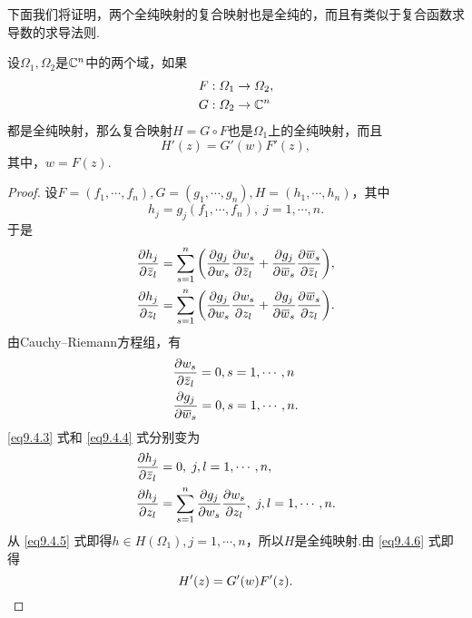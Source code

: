 下面我们将证明，两个全纯映射的复合映射也是全纯的，而且有类似于复合函数求导数的求导法则.
\begin{prop}\label{prop9.4.4}
  设$\Omega_1,\Omega_2$是$\mathbb C^n$中的两个域，如果
  \begin{align*}
    & F:\varOmega_1 \to \varOmega_2,\\
    & G:\varOmega_2 \to \mathbb C^n
  \end{align*}
  都是全纯映射，那么复合映射$H=G\circ F$也是$\Omega_1$上的全纯映射，而且
  \[
    H'(z) = G'(w)F'(z),
  \]
  其中，$w=F(z)$.
\end{prop}
\begin{proof}
  设$F=(f_1,\cdots,f_n),G=(g_1,\cdots,g_n),H=(h_1,\cdots,h_n)$，其中
  \[
    h_j = g_j(f_1,\cdots,f_n),\;j=1,\cdots,n.
  \]
  于是
  \begin{align}
    & \frac{\partial h_j}{\partial {}\mkern2mu\overline{\mkern-2muz}_l} = \sum_{s=1}^n\bigg(\frac{\partial g_j}{\partial w_s}\frac{\partial w_s}{\partial {}\mkern2mu\overline{\mkern-2muz}_l}
    + \frac{\partial g_j}{\partial {}\mkern2mu\overline{\mkern-2muw}_s}\frac{\partial {}\mkern2mu\overline{\mkern-2muw}_s}{\partial {}\mkern2mu\overline{\mkern-2muz}_l}\bigg),\label{eq9.4.3}\\
    & \frac{\partial h_j}{\partial z_l}=\sum_{s=1}^n\bigg(\frac{\partial g_j}{\partial w_s}\frac{\partial w_s}{\partial z_l}
    + \frac{\partial g_j}{\partial {}\mkern2mu\overline{\mkern-2muw}_s}\frac{\partial {}\mkern2mu\overline{\mkern-2muw}_s}{\partial z_l}\bigg).\label{eq9.4.4}
  \end{align}
  由Cauchy--Riemann方程组，有
  \begin{align*}
    & \frac{\partial w_s}{\partial {}\mkern2mu\overline{\mkern-2muz}_l} = 0, s = 1,\cdots ,n\\
    & \frac{\partial g_j}{\partial {}\mkern2mu\overline{\mkern-2muw}_s} = 0,s = 1,\cdots,n.
  \end{align*}
  \eqref{eq9.4.3} 式和 \eqref{eq9.4.4} 式分别变为
  \begin{align}
    & \frac{\partial h_j}{\partial {}\mkern2mu\overline{\mkern-2muz}_l} =  0 ,\;j,l=1,\cdots,n,\label{eq9.4.5}\\
    & \frac{\partial h_j}{\partial z_l}=\sum_{s=1}^n\frac{\partial g_j}{\partial w_s}\frac{\partial w_s}{\partial z_l},\;j,l=1,\cdots,n.\label{eq9.4.6}
  \end{align}
  从 \eqref{eq9.4.5} 式即得$h\in H(\Omega_1),j=1,\cdots,n$，所以$H$是全纯映射.由 \eqref{eq9.4.6} 式即得
  \begin{equation*}
    H'(z) = G'(w)F'(z). \qedhere
  \end{equation*}
\end{proof}

